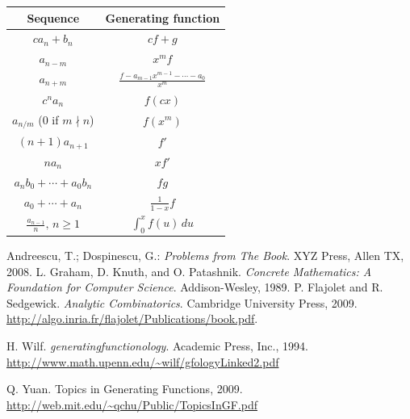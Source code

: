 \noindent \begin{tabular}{|c|c|}
\hline 
Sequence & Generating function\tabularnewline
\hline 
$ca_{n}+b_{n}$ & $cf+g$\tabularnewline
\hline 
$a_{n-m}$ & $x^{m}f$\tabularnewline
\hline 
$a_{n+m}$ & $\displaystyle \frac{f-a_{m-1}x^{m-1}-\cdots-a_{0}}{x^{m}}$\tabularnewline
\hline 
$c^{n}a_{n}$ & $f(cx)$\tabularnewline
\hline 
$a_{n/m}$ (0 if $m\nmid n$) & $f(x^{m})$\tabularnewline
\hline 
$(n+1)a_{n+1}$ & $f'$\tabularnewline
\hline 
$na_{n}$ & $xf'$\tabularnewline
\hline 
$a_{n}b_{0}+\cdots+a_{0}b_{n}$ & $fg$\tabularnewline
\hline 
$a_{0}+\cdots+a_{n}$ & $\displaystyle \frac{1}{1-x}f$\tabularnewline
\hline 
$\displaystyle \frac{a_{n-1}}{n},\, n\ge1$ & $\displaystyle \int_{0}^{x}f(u)\, du$\tabularnewline
\hline
\end{tabular}
\begin{thebibliography}{9}
 Andreescu, T.; Dospinescu, G.: {\it Problems from The Book}. XYZ Press, Allen TX, 2008.
 L. Graham, D. Knuth, and O. Patashnik. {\it Concrete Mathematics: A Foundation for Computer Science}. Addison-Wesley, 1989.
 P. Flajolet and R. Sedgewick. {\it Analytic Combinatorics}. Cambridge University Press, 2009. \url{http://algo.inria.fr/flajolet/Publications/book.pdf}.

 H. Wilf. {\it generatingfunctionology}. Academic Press, Inc., 1994. 
\url{http://www.math.upenn.edu/~wilf/gfologyLinked2.pdf}

 Q. Yuan. Topics in Generating Functions, 2009.  \url{http://web.mit.edu/~qchu/Public/TopicsInGF.pdf}
\end{thebibliography}
